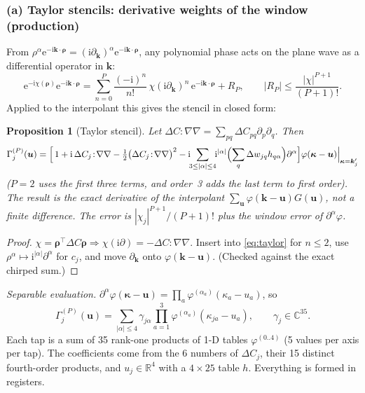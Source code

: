\documentclass[11pt]{article}
\newtheorem{proposition}{Proposition}
\theoremstyle{remark}
\newcommand{\kk}{\bm k}
\newcommand{\uu}{\bm u}
\newcommand{\ii}{\mathrm i}
\newcommand{\ee}{\mathrm e}
\newcommand{\CC}{\mathbb C}
\newcommand{\RR}{\mathbb R}
\begin{document}
\subsubsection*{(a) Taylor stencils: derivative weights of the window (production)}
From $\rho^\alpha\ee^{-\ii\kk\cdot\bm\rho}=(\ii\partial_{\kk})^\alpha\ee^{-\ii\kk\cdot\bm\rho}$, any polynomial phase acts on the plane wave as a differential operator in $\kk$:
\begin{equation}
  \ee^{-\ii\chi(\bm\rho)}\ee^{-\ii\kk\cdot\bm\rho}=\sum_{n=0}^{P}\frac{(-\ii)^n}{n!}\,\chi(\ii\partial_{\kk})^n\,\ee^{-\ii\kk\cdot\bm\rho}+R_P,\qquad |R_P|\le\frac{|\chi|^{P+1}}{(P+1)!}.
  \label{eq:taylor}
\end{equation}
Applied to the interpolant this gives the stencil in closed form:
\begin{proposition}[Taylor stencil]
\label{prop:dweights}
Let $\Delta C:\nabla\nabla=\sum_{pq}\Delta C_{pq}\partial_{p}\partial_{q}$. Then
\begin{equation}
  \Gamma_j^{(P)}(\uu)=\Bigl[\,1+\ii\,\Delta C_j\!:\!\nabla\nabla-\tfrac12\bigl(\Delta C_j\!:\!\nabla\nabla\bigr)^2
  -\ii\!\!\sum_{3\le|\alpha|\le4}\!\!\ii^{|\alpha|}\Bigl(\sum_q\Delta w_{jq}h_{q\alpha}\Bigr)\partial^\alpha\Bigr]\varphi(\bm\kappa-\uu)\Big|_{\bm\kappa=\kk_j'}
  \label{eq:dstencil}
\end{equation}
($P=2$ uses the first three terms, and order~3 adds the last term to first order). The result is the exact derivative of the interpolant $\sum_{\uu}\varphi(\kk-\uu)G(\uu)$, not a finite difference. The error is $|\chi_j|^{P+1}/(P+1)!$ plus the window error of $\partial^\alpha\varphi$.
\end{proposition}
\begin{proof}
$\chi=\bm\rho^{\!\top}\Delta C\bm\rho\Rightarrow\chi(\ii\partial)=-\Delta C:\nabla\nabla$. Insert into \cref{eq:taylor} for $n\le2$, use $\rho^\alpha\mapsto\ii^{|\alpha|}\partial^\alpha$ for $c_j$, and move $\partial_{\kk}$ onto $\varphi(\kk-\uu)$. (Checked against the exact chirped sum.)
\end{proof}
\noindent\emph{Separable evaluation.} $\partial^\alpha\varphi(\bm\kappa-\uu)=\prod_a\varphi^{(\alpha_a)}(\kappa_a-u_a)$, so
\begin{equation}
  \Gamma^{(P)}_j(\uu)=\sum_{|\alpha|\le4}\gamma_{j\alpha}\prod_{a=1}^3\varphi^{(\alpha_a)}(\kappa_{ja}-u_a),\qquad\gamma_j\in\CC^{35}.
\end{equation}
Each tap is a sum of 35 rank-one products of 1-D tables $\varphi^{(0..4)}$ (5 values per axis per tap). The coefficients come from the 6 numbers of $\Delta C_j$, their 15 distinct fourth-order products, and $u_j\in\RR^4$ with a $4\times25$ table $h$. Everything is formed in registers.
\end{document}
